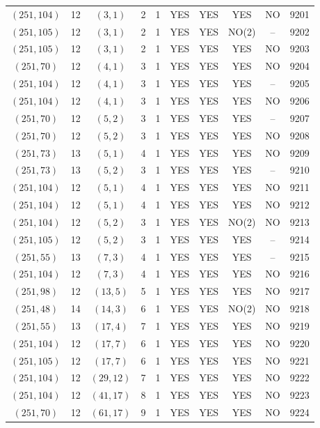 \begin{longtable}{|c|c|c|c|c|c|c|c|c|c|}
$(251, 104)$ & 12 & $(3, 1)$ & 2 & 1 & YES & YES & YES & NO & 9201\\
$(251, 105)$ & 12 & $(3, 1)$ & 2 & 1 & YES & YES & NO(2) & -- & 9202\\
$(251, 105)$ & 12 & $(3, 1)$ & 2 & 1 & YES & YES & YES & NO & 9203\\
$(251, 70)$ & 12 & $(4, 1)$ & 3 & 1 & YES & YES & YES & NO & 9204\\
$(251, 104)$ & 12 & $(4, 1)$ & 3 & 1 & YES & YES & YES & -- & 9205\\
$(251, 104)$ & 12 & $(4, 1)$ & 3 & 1 & YES & YES & YES & NO & 9206\\
$(251, 70)$ & 12 & $(5, 2)$ & 3 & 1 & YES & YES & YES & -- & 9207\\
$(251, 70)$ & 12 & $(5, 2)$ & 3 & 1 & YES & YES & YES & NO & 9208\\
$(251, 73)$ & 13 & $(5, 1)$ & 4 & 1 & YES & YES & YES & NO & 9209\\
$(251, 73)$ & 13 & $(5, 2)$ & 3 & 1 & YES & YES & YES & -- & 9210\\
$(251, 104)$ & 12 & $(5, 1)$ & 4 & 1 & YES & YES & YES & NO & 9211\\
$(251, 104)$ & 12 & $(5, 1)$ & 4 & 1 & YES & YES & YES & NO & 9212\\
$(251, 104)$ & 12 & $(5, 2)$ & 3 & 1 & YES & YES & NO(2) & NO & 9213\\
$(251, 105)$ & 12 & $(5, 2)$ & 3 & 1 & YES & YES & YES & -- & 9214\\
$(251, 55)$ & 13 & $(7, 3)$ & 4 & 1 & YES & YES & YES & -- & 9215\\
$(251, 104)$ & 12 & $(7, 3)$ & 4 & 1 & YES & YES & YES & NO & 9216\\
$(251, 98)$ & 12 & $(13, 5)$ & 5 & 1 & YES & YES & YES & NO & 9217\\
$(251, 48)$ & 14 & $(14, 3)$ & 6 & 1 & YES & YES & NO(2) & NO & 9218\\
$(251, 55)$ & 13 & $(17, 4)$ & 7 & 1 & YES & YES & YES & NO & 9219\\
$(251, 104)$ & 12 & $(17, 7)$ & 6 & 1 & YES & YES & YES & NO & 9220\\
$(251, 105)$ & 12 & $(17, 7)$ & 6 & 1 & YES & YES & YES & NO & 9221\\
$(251, 104)$ & 12 & $(29, 12)$ & 7 & 1 & YES & YES & YES & NO & 9222\\
$(251, 104)$ & 12 & $(41, 17)$ & 8 & 1 & YES & YES & YES & NO & 9223\\
$(251, 70)$ & 12 & $(61, 17)$ & 9 & 1 & YES & YES & YES & NO & 9224\\

\end{longtable}
